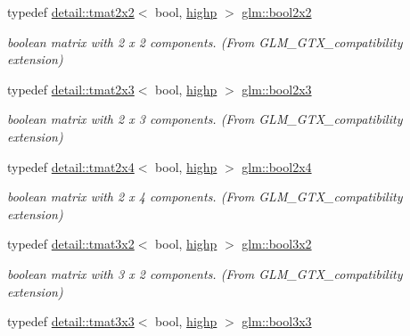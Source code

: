 \begin{DoxyCompactItemize}
typedef \hyperlink{structglm_1_1detail_1_1tmat2x2}{detail\+::tmat2x2}$<$ bool, \hyperlink{namespaceglm_a0f04f086094c747d227af4425893f545ac6f7eab42eacbb10d59a58e95e362074}{highp} $>$ \hyperlink{group__gtx__compatibility_ga44cd09c0dad9ea163f038a342555867f}{glm\+::bool2x2}
\begin{DoxyCompactList}\small\item\em boolean matrix with 2 x 2 components. (From G\+L\+M\+\_\+\+G\+T\+X\+\_\+compatibility extension) \end{DoxyCompactList}\item 
typedef \hyperlink{structglm_1_1detail_1_1tmat2x3}{detail\+::tmat2x3}$<$ bool, \hyperlink{namespaceglm_a0f04f086094c747d227af4425893f545ac6f7eab42eacbb10d59a58e95e362074}{highp} $>$ \hyperlink{group__gtx__compatibility_ga75013772bb088d107a1c1a994e7f9b14}{glm\+::bool2x3}
\begin{DoxyCompactList}\small\item\em boolean matrix with 2 x 3 components. (From G\+L\+M\+\_\+\+G\+T\+X\+\_\+compatibility extension) \end{DoxyCompactList}\item 
typedef \hyperlink{structglm_1_1detail_1_1tmat2x4}{detail\+::tmat2x4}$<$ bool, \hyperlink{namespaceglm_a0f04f086094c747d227af4425893f545ac6f7eab42eacbb10d59a58e95e362074}{highp} $>$ \hyperlink{group__gtx__compatibility_gaf24096d8a88d274b94002386a3fcab0c}{glm\+::bool2x4}
\begin{DoxyCompactList}\small\item\em boolean matrix with 2 x 4 components. (From G\+L\+M\+\_\+\+G\+T\+X\+\_\+compatibility extension) \end{DoxyCompactList}\item 
typedef \hyperlink{structglm_1_1detail_1_1tmat3x2}{detail\+::tmat3x2}$<$ bool, \hyperlink{namespaceglm_a0f04f086094c747d227af4425893f545ac6f7eab42eacbb10d59a58e95e362074}{highp} $>$ \hyperlink{group__gtx__compatibility_gacf961fda4c64459911f552cbffdbffa8}{glm\+::bool3x2}
\begin{DoxyCompactList}\small\item\em boolean matrix with 3 x 2 components. (From G\+L\+M\+\_\+\+G\+T\+X\+\_\+compatibility extension) \end{DoxyCompactList}\item 
typedef \hyperlink{structglm_1_1detail_1_1tmat3x3}{detail\+::tmat3x3}$<$ bool, \hyperlink{namespaceglm_a0f04f086094c747d227af4425893f545ac6f7eab42eacbb10d59a58e95e362074}{highp} $>$ \hyperlink{group__gtx__compatibility_gae9cc5d3d9c72543e303af4d702bf7b40}{glm\+::bool3x3}

\end{DoxyCompactItemize}
